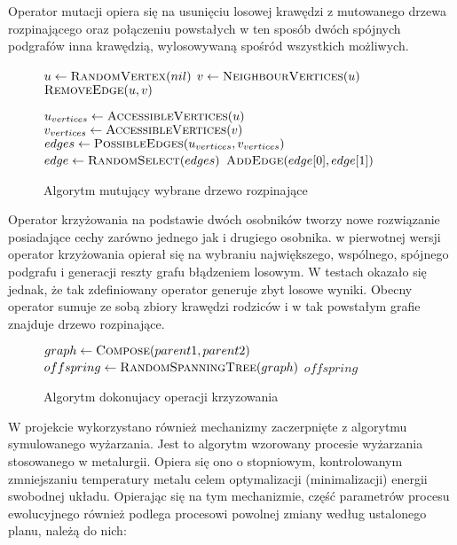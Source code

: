 \documentclass[12pt]{article}
\begin{document}
Operator mutacji opiera się na usunięciu losowej krawędzi z mutowanego drzewa rozpinającego oraz połączeniu powstałych w ten sposób dwóch spójnych podgrafów inna krawędzią, wylosowywaną spośród wszystkich możliwych.


\begin{figure}[h!]
 \centering
\begin{algorithmic}
\State $u\gets \Call{RandomVertex}{nil}$
\State $v\gets \Call{NeighbourVertices}{u}$
\State $\Call{RemoveEdge}{u,v}$

\State $u_{vertices}\gets \Call{AccessibleVertices}{u}$
\State $v_{vertices}\gets \Call{AccessibleVertices}{v}$
\State $edges \gets \Call{PossibleEdges}{u_{vertices}, v_{vertices}}$
\State $edge \gets \Call{RandomSelect}{edges}$
\State $\Call{AddEdge}{edge[0],edge[1]}$

\EndFunction

\end{algorithmic}
\caption{Algorytm mutujący wybrane drzewo rozpinające}
\end{figure}
 
 
Operator krzyżowania na podstawie dwóch osobników tworzy nowe rozwiązanie posiadające cechy zarówno jednego jak i drugiego osobnika. w pierwotnej wersji operator krzyżowania opierał się na wybraniu największego, wspólnego, spójnego podgrafu i generacji reszty grafu błądzeniem losowym. W testach okazało się jednak, że tak zdefiniowany operator generuje zbyt losowe wyniki. Obecny operator sumuje ze sobą zbiory krawędzi rodziców i w tak powstałym grafie znajduje drzewo rozpinające.
 
 
 
\begin{figure}[h!]
 \centering
\begin{algorithmic}
\State $graph \gets \Call{Compose}{parent1, parent2}$
\State $offspring \gets \Call{RandomSpanningTree}{graph}$
\Return $offspring$

\EndFunction

\end{algorithmic}
\caption{Algorytm dokonujacy operacji krzyzowania}
\end{figure}
 
 
W projekcie wykorzystano również mechanizmy zaczerpnięte z algorytmu symulowanego wyżarzania. Jest to algorytm wzorowany procesie wyżarzania stosowanego w metalurgii. Opiera się ono o stopniowym, kontrolowanym zmniejszaniu temperatury metalu celem optymalizacji (minimalizacji) energii swobodnej układu. Opierając się na tym mechanizmie, część parametrów procesu ewolucyjnego również podlega procesowi powolnej zmiany według ustalonego planu, należą do nich:
\end{document}
